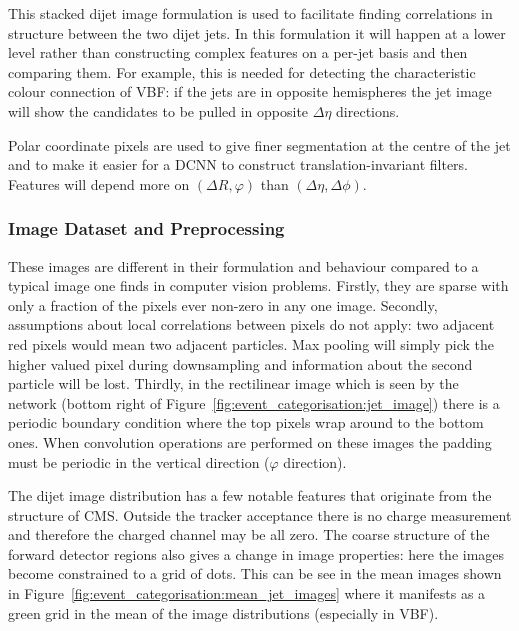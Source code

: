 
This stacked dijet image formulation is used to facilitate finding correlations in structure between the two dijet jets. 
In this formulation it will happen at a lower level rather than constructing complex features on a per-jet basis and then comparing them. 
For example, this is needed for detecting the characteristic colour connection of VBF: if the jets are in opposite hemispheres the jet image will show the candidates to be pulled in opposite $\Delta\eta$ directions. 

Polar coordinate pixels are used to give finer segmentation at the centre of the jet and to make it easier for a DCNN to construct translation-invariant filters. Features will depend more on $(\Delta{R},\varphi)$ than $(\Delta\eta,\Delta\phi)$. 


\subsubsection{Image Dataset and Preprocessing}
These images are different in their formulation and behaviour compared to a typical image one finds in computer vision problems.
Firstly, they are sparse with only a fraction of the pixels ever non-zero in any one image. 
Secondly, assumptions about local correlations between pixels do not apply: two adjacent red pixels would mean two adjacent particles. Max pooling will simply pick the higher valued pixel during downsampling and information about the second particle will be lost. 
Thirdly, in the rectilinear image which is seen by the network (bottom right of Figure~\ref{fig:event_categorisation:jet_image}) there is a periodic boundary condition where the top pixels wrap around to the bottom ones. When convolution operations are performed on these images the padding must be periodic in the vertical direction ($\varphi$ direction).

The dijet image distribution has a few notable features that originate from the structure of CMS. Outside the tracker acceptance there is no charge measurement and therefore the charged \pt channel may be all zero. The coarse structure of the forward detector regions also gives a change in image properties: here the images become constrained to a grid of dots. This can be see in the mean images shown in Figure~\ref{fig:event_categorisation:mean_jet_images} where it manifests as a green grid in the mean of the image distributions (especially in VBF).

